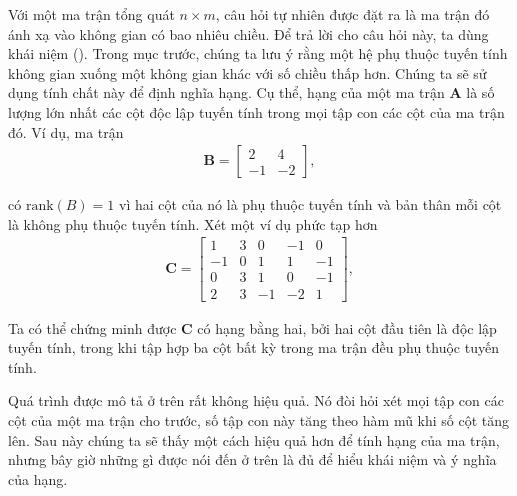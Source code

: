 \documentclass[letterpaper,11pt,english]{sphinxmanual}
\begin{document}
Với một ma trận tổng quát \(n\times m\), câu hỏi tự nhiên được đặt
ra là ma trận đó ánh xạ vào không gian có bao nhiêu chiều. Để trả lời
cho câu hỏi này, ta dùng khái niệm  (). Trong mục trước,
chúng ta lưu ý rằng một hệ phụ thuộc tuyến tính  không gian xuống
một không gian khác với số chiều thấp hơn. Chúng ta sẽ sử dụng tính chất
này để định nghĩa hạng. Cụ thể, hạng của một ma trận \(\mathbf{A}\)
là số lượng lớn nhất các cột độc lập tuyến tính trong mọi tập con các
cột của ma trận đó. Ví dụ, ma trận
\begin{equation}\label{equation:chapter_appendix_math/geometry-linear-algebric-ops_vn:chapter_appendix_math/geometry-linear-algebric-ops_vn:16}
\begin{split}\mathbf{B} = \begin{bmatrix}
2 & 4 \\ -1 & -2
\end{bmatrix},\end{split}
\end{equation}


có \(\mathrm{rank}(B)=1\) vì hai cột của nó là phụ thuộc tuyến tính
và bản thân mỗi cột là không phụ thuộc tuyến tính. Xét một ví dụ phức
tạp hơn
\begin{equation}\label{equation:chapter_appendix_math/geometry-linear-algebric-ops_vn:chapter_appendix_math/geometry-linear-algebric-ops_vn:17}
\begin{split}\mathbf{C} = \begin{bmatrix}
1& 3 & 0 & -1 & 0 \\
-1 & 0 & 1 & 1 & -1 \\
0 & 3 & 1 & 0 & -1 \\
2 & 3 & -1 & -2 & 1
\end{bmatrix},\end{split}
\end{equation}


Ta có thể chứng minh được \(\mathbf{C}\) có hạng bằng hai, bởi hai
cột đầu tiên là độc lập tuyến tính, trong khi tập hợp ba cột bất kỳ
trong ma trận đều phụ thuộc tuyến tính.



Quá trình được mô tả ở trên rất không hiệu quả. Nó đòi hỏi xét mọi tập
con các cột của một ma trận cho trước, số tập con này tăng theo hàm mũ
khi số cột tăng lên. Sau này chúng ta sẽ thấy một cách hiệu quả hơn để
tính hạng của ma trận, nhưng bây giờ những gì được nói đến ở trên là đủ
để hiểu khái niệm và ý nghĩa của hạng.
\end{document}
